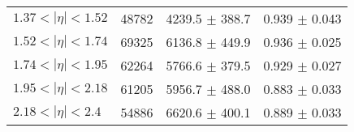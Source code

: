\begin{tabular}{lccc}
$1.37 < |\eta| <1.52$          & 48782      & 4239.5     $\pm$ 388.7 & 0.939      $\pm$ 0.043 \\
$1.52 < |\eta| <1.74$          & 69325      & 6136.8     $\pm$ 449.9 & 0.936      $\pm$ 0.025 \\
$1.74 < |\eta| <1.95$          & 62264      & 5766.6     $\pm$ 379.5 & 0.929      $\pm$ 0.027 \\
$1.95 < |\eta| <2.18$          & 61205      & 5956.7     $\pm$ 488.0 & 0.883      $\pm$ 0.033 \\
$2.18 < |\eta| <2.4$           & 54886      & 6620.6     $\pm$ 400.1 & 0.889      $\pm$ 0.033 \\
\hline
\end{tabular}
